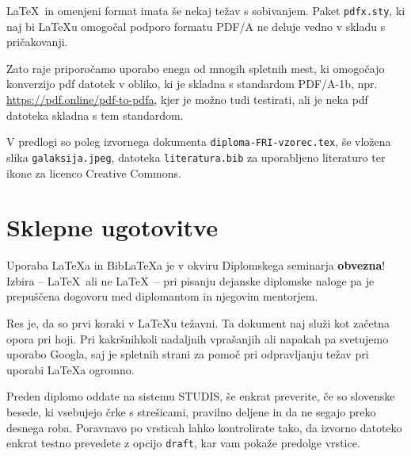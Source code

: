 \documentclass[a4paper,12pt,openright]{book}
\newcommand{\BibLaTeX}{{\sc Bib}\LaTeX}
\begin{document}
    \LaTeX\ in omenjeni format imata še nekaj težav s sobivanjem.
    Paket \texttt{pdfx.sty}, ki naj bi \LaTeX{u} omogočal podporo formatu PDF/A ne deluje vedno
    v skladu s pričakovanji.

    Zato raje priporočamo uporabo enega od mnogih spletnih mest, ki omo\-go\-ča\-jo konverzijo pdf datotek v obliko,
    ki je skladna s standardom PDF/A-1b, npr. \url{https://pdf.online/pdf-to-pdfa}, kjer je
    možno tudi testirati, ali je neka pdf datoteka skladna s tem standardom.

    V predlogi so poleg izvornega dokumenta \texttt{diploma-FRI-vzorec.tex}, še vložena slika \texttt{galaksija.jpeg}, datoteka \texttt{literatura.bib} za uporabljeno literaturo ter
    ikone za licenco Creative Commons.


    \chapter{Sklepne ugotovitve}

    Uporaba \LaTeX{a} in \BibLaTeX{a} je v okviru Diplomskega seminarja \textbf{obvezna}!
    Izbira -- \LaTeX\ ali ne \LaTeX\ -- pri pisanju dejanske diplomske naloge pa je pre\-pu\-šče\-na dogovoru med diplomantom in njegovim mentorjem.

    Res je, da so prvi koraki v \LaTeX{}u težavni.
    Ta dokument naj služi kot začetna opora pri hoji.
    Pri kakršnihkoli nadaljnih vprašanjih ali napakah pa svetujemo uporabo Googla, saj je spletnih strani za pomoč pri odpravljanju težav pri uporabi \LaTeX{}a ogromno.

    Preden diplomo oddate na sistemu STUDIS, še enkrat preverite, če so slovenske besede, ki vsebujejo črke s strešicami,  pravilno deljene in da ne segajo preko desnega roba.
    Poravnavo po vrsticah lahko kontrolirate tako, da izvorno datoteko enkrat testno prevedete z opcijo \texttt{draft}, kar vam pokaže predolge vrstice.



    \printbibliography[heading=bibintoc,type=article,title={Članki v revijah}]

    \printbibliography[heading=bibintoc,type=inproceedings,title={Članki v zbornikih}]

    \printbibliography[heading=bibintoc,type=incollection,title={Poglavja v knjigah}]

    \printbibliography[heading=bibintoc,title={Celotna literatura}]
\end{document}
